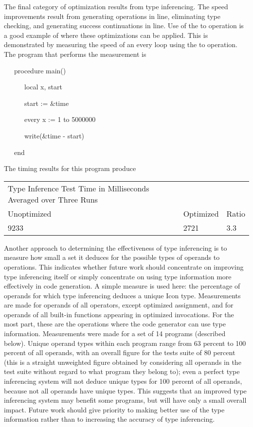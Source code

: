 The final category of optimization results from type inferencing. The
speed improvements result from generating operations in line,
eliminating type checking, and generating success continuations in
line. Use of the to operation is a good example of where these
optimizations can be applied. This is demonstrated by measuring the
speed of an every loop using the to operation. The program that
performs the measurement is

{\ttfamily\mdseries
\ \ \ procedure main()}

{\ttfamily\mdseries
\ \ \ \ \ \ local x, start}

{\ttfamily\mdseries
\ \ \ \ \ \ start := \&time}

{\ttfamily\mdseries
\ \ \ \ \ \ every x := 1 to 5000000}

{\ttfamily\mdseries
\ \ \ \ \ \ write(\&time - start)}

{\ttfamily\mdseries
\ \ \ end}


The timing results for this program produce 

\begin{center}
\tablefirsthead{}
\tablehead{}
\tabletail{}
\tablelasttail{}
\begin{xtabular}{m{3.2691598in}m{0.6830598in}m{0.33445984in}}
 Type Inference Test\newline
Time in Milliseconds Averaged over Three Runs &
~
 &
~
\\
 Unoptimized &
 Optimized &
 Ratio\\
 9233  &
 2721  &
 3.3 \\
\end{xtabular}
\end{center}

Another approach to determining the effectiveness of type inferencing
is to measure how small a set it deduces for the possible types of
operands to operations. This indicates whether future work should
concentrate on improving type inferencing itself or simply concentrate
on using type information more effectively in code generation. A
simple measure is used here: the percentage of operands for which type
inferencing deduces a unique Icon type. Measurements are made for
operands of all operators, except optimized assignment, and for
operands of all built-in functions appearing in optimized
invocations. For the most part, these are the operations where the
code generator can use type information. Measurements were made for a
set of 14 programs (described below). Unique operand types within each
program range from 63 percent to 100 percent of all operands, with an
overall figure for the tests suite of 80 percent (this is a straight
unweighted figure obtained by considering all operands in the test
suite without regard to what program they belong to); even a perfect
type inferencing system will not deduce unique types for 100 percent
of all operands, because not all operands have unique types. This
suggests that an improved type inferencing system may benefit some
programs, but will have only a small overall impact. Future work
should give priority to making better use of the type information
rather than to increasing the accuracy of type inferencing.


